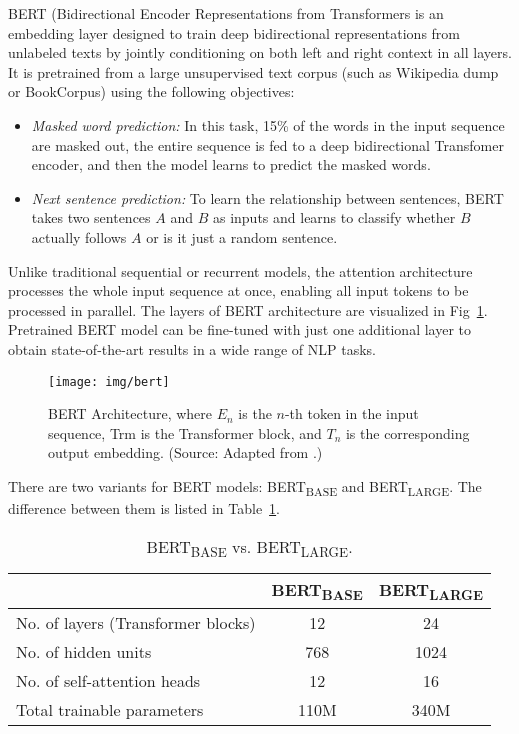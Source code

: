 \documentclass[conference]{IEEEtran}
\begin{document}
BERT (Bidirectional Encoder Representations from Transformers is an embedding layer designed to train deep bidirectional representations from unlabeled texts by jointly conditioning on both left and right context in all layers. It is pretrained from a large unsupervised text corpus (such as Wikipedia dump or BookCorpus) using the following objectives:

\begin{itemize}
    \item \emph{Masked word prediction:}
        In this task, 15\% of the words in the input sequence are masked out, the entire sequence is fed to a deep bidirectional Transfomer\cite{attention} encoder, and then the model learns to predict the masked words.
    \item \emph{Next sentence prediction:}
        To learn the relationship between sentences, BERT takes two sentences $A$ and $B$ as inputs and learns to classify whether $B$ actually follows $A$ or is it just a random sentence.
\end{itemize}

Unlike traditional sequential or recurrent models, the attention architecture processes the whole input sequence at once, enabling all input tokens to be processed in parallel. The layers of BERT architecture are visualized in Fig~\ref{fig:bert}. Pretrained BERT model can be fine-tuned with just one additional layer to obtain state-of-the-art results in a wide range of NLP tasks\cite{bert}.

\begin{figure}[ht]
    \centering
    \texttt{[image: img/bert]}
    \caption{BERT Architecture, where $E_n$ is the $n$-th token in the input sequence, Trm is the Transformer block, and $T_n$ is the corresponding output embedding. (Source: Adapted from \cite{bert}.)}
    \label{fig:bert}
\end{figure}

There are two variants for BERT models: BERT\textsubscript{BASE} and BERT\textsubscript{LARGE}. The difference between them is listed in Table~\ref{tab:base-large}.

\begin{table}[ht]
    \renewcommand{\arraystretch}{1.2}
    \caption{BERT\textsubscript{BASE} vs. BERT\textsubscript{LARGE}.}
    \label{tab:base-large}
    \centering
    \begin{tabular}{lcc}
        \toprule
         & BERT\textsubscript{BASE} & BERT\textsubscript{LARGE} \\
         \midrule
        No. of layers (Transformer blocks) & 12 & 24 \\
No. of hidden units & 768 & 1024 \\
No. of self-attention heads & 12 & 16 \\
Total trainable parameters & 110M & 340M \\
        \bottomrule
    \end{tabular}
\end{table}
\end{document}
